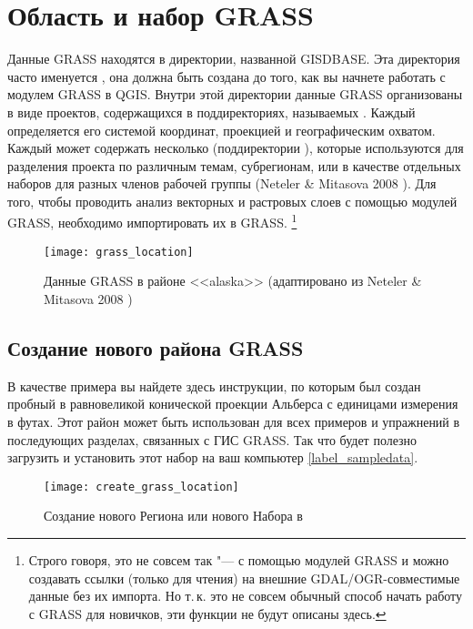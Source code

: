 \section{Область и набор GRASS}\label{sec:about_loc}

Данные GRASS находятся в директории, названной GISDBASE. Эта директория
часто именуется , она должна быть создана до того,
как вы начнете работать с модулем GRASS в QGIS. Внутри этой директории
данные GRASS организованы в виде проектов, содержащихся в поддиректориях,
называемых . Каждый  определяется
его системой координат, проекцией и географическим охватом. Каждый
 может содержать несколько 
(поддиректории ), которые используются для разделения
проекта по различным темам, субрегионам, или в качестве отдельных
наборов для разных членов рабочей группы (Neteler \& Mitasova 2008
\cite{neteler_mitasova08}). Для того, чтобы проводить анализ векторных
и растровых слоев с помощью модулей GRASS, необходимо импортировать их
в  GRASS.
\footnote{Строго говоря, это не совсем так "--- с помощью модулей GRASS
 и  можно создавать ссылки
(только для чтения) на внешние GDAL/OGR-совместимые данные без их
импорта. Но т.\,к. это не совсем обычный способ начать работу с GRASS
для новичков, эти функции не будут описаны здесь.}


\begin{figure}[ht]
\centering
\texttt{[image: grass\_location]}
\caption{Данные GRASS в районе <<alaska>> (адаптировано из Neteler \& Mitasova 2008 \cite{neteler_mitasova08})}\label{fig:grass_location}\end{figure}

\subsection{Создание нового района GRASS}\label{sec:create_loc}

В качестве примера вы найдете здесь инструкции, по которым был создан
пробный  в равновеликой конической проекции
Альберса с единицами измерения в футах. Этот район может быть использован
для всех примеров и упражнений в последующих разделах, связанных с ГИС
GRASS. Так что будет полезно загрузить и установить этот набор на ваш
компьютер \ref{label_sampledata}.

\begin{figure}[ht]
\centering
\texttt{[image: create\_grass\_location]}
\caption{Создание нового \grass Региона или нового Набора в \qg \nixcaption}
\label{fig:create_grass_location}
\end{figure}

